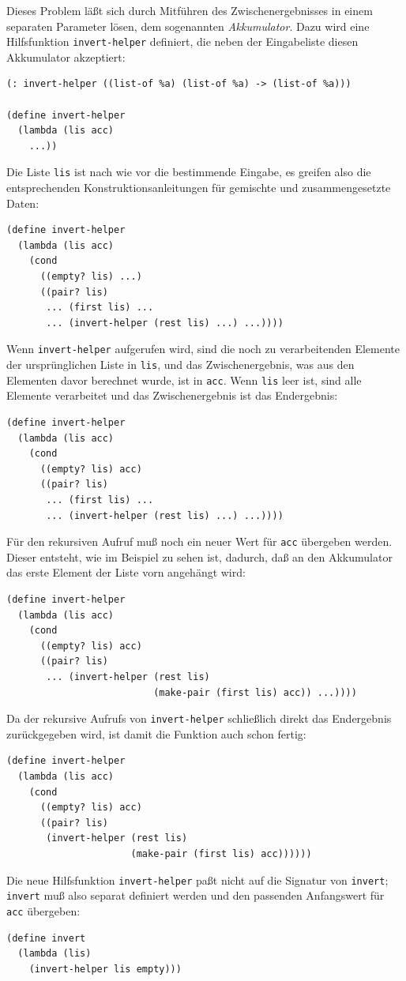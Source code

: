 Dieses Problem läßt sich durch Mitführen des Zwischenergebnisses in
einem separaten Parameter lösen, dem sogenannten
\textit{Akkumulator}.  Dazu wird eine
Hilfsfunktion \texttt{invert-helper} definiert, die neben der Eingabeliste
diesen Akkumulator akzeptiert:
%
\begin{verbatim}
(: invert-helper ((list-of %a) (list-of %a) -> (list-of %a)))

(define invert-helper
  (lambda (lis acc)
    ...))
\end{verbatim}
%
Die Liste \texttt{lis} ist nach wie vor die bestimmende Eingabe, es
greifen also die entsprechenden Konstruktionsanleitungen für gemischte
und zusammengesetzte Daten:
%
\begin{verbatim}
(define invert-helper
  (lambda (lis acc)
    (cond
      ((empty? lis) ...)
      ((pair? lis)
       ... (first lis) ...
       ... (invert-helper (rest lis) ...) ...))))
\end{verbatim}
%
Wenn \texttt{invert-helper} aufgerufen wird, sind die noch zu
verarbeitenden Elemente der ursprünglichen Liste in \texttt{lis}, und
das Zwischenergebnis, was aus den Elementen davor berechnet wurde, ist
in \texttt{acc}.  Wenn \texttt{lis} leer ist, sind alle Elemente
verarbeitet und das Zwischenergebnis ist das Endergebnis:
%
\begin{verbatim}
(define invert-helper
  (lambda (lis acc)
    (cond
      ((empty? lis) acc)
      ((pair? lis)
       ... (first lis) ...
       ... (invert-helper (rest lis) ...) ...))))
\end{verbatim}
%
Für den rekursiven Aufruf muß noch ein neuer Wert für \texttt{acc}
übergeben werden.  Dieser entsteht, wie im Beispiel zu sehen ist,
dadurch, daß an den Akkumulator das erste Element der Liste vorn
angehängt wird:
%
\begin{verbatim}
(define invert-helper
  (lambda (lis acc)
    (cond
      ((empty? lis) acc)
      ((pair? lis)
       ... (invert-helper (rest lis)
                          (make-pair (first lis) acc)) ...))))
\end{verbatim}
%
Da der rekursive Aufrufs von \texttt{invert-helper} schließlich direkt das
Endergebnis zurückgegeben wird, ist damit die Funktion auch schon fertig:
%
\begin{verbatim}
(define invert-helper
  (lambda (lis acc)
    (cond
      ((empty? lis) acc)
      ((pair? lis)
       (invert-helper (rest lis)
                      (make-pair (first lis) acc))))))
\end{verbatim}
%
Die neue Hilfsfunktion \texttt{invert-helper} paßt nicht auf die Signatur
von \texttt{invert}; \texttt{invert} muß also separat definiert werden
und den passenden Anfangswert für \texttt{acc} übergeben:
%
\begin{verbatim}
(define invert
  (lambda (lis)
    (invert-helper lis empty)))
\end{verbatim}
%

